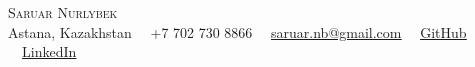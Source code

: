 \documentclass[letterpaper,10pt]{article}
\begin{document}


\begin{center}
    {\Huge \scshape Saruar Nurlybek} \\
    \vspace{3pt}
    \small Astana, Kazakhstan \ \textbar\ +7 702 730 8866 \ \textbar\
    \href{mailto:saruar.nb@gmail.com}{\underline{saruar.nb@gmail.com}} \ \textbar\
    \href{https://github.com/saruar-ryskaliyev/}{\underline{GitHub}} \ \textbar\
    \href{https://www.linkedin.com/in/saruar-nurlybek/}{\underline{LinkedIn}}
    \vspace{-8pt}
\end{center}



\end{document}
